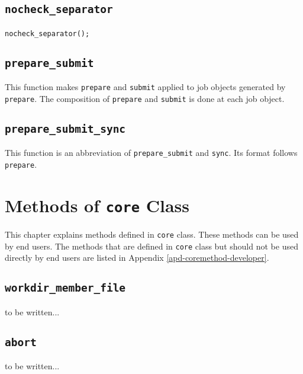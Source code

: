 \documentclass[a4paper,10pt]{report}
\begin{document}
\section{\texttt{nocheck\_separator}}

\subsubsection{\format}

\begin{boxnote}
\begin{alltt}
nocheck_separator();
\end{alltt}
\end{boxnote}
\vspace{\baselineskip}

\section{\texttt{prepare\_submit}}

This function makes \texttt{prepare} and \texttt{submit} applied to
job objects generated by \texttt{prepare}.  The composition of
\texttt{prepare} and \texttt{submit} is done at each job object.

\section{\texttt{prepare\_submit\_sync}}

This function is an abbreviation of \texttt{prepare\_submit} and
\texttt{sync}.  Its format follows \texttt{prepare}.

\chapter{Methods of \texttt{core} Class}\label{chap-coremethod-enduser}
This chapter explains methods defined in \texttt{core} class.
These methods can be used by end users.
The methods that are defined in \texttt{core} class but
should not be used directly by end users are listed in
Appendix \ref{apd-coremethod-developer}.

\section{\texttt{workdir\_member\_file}}
to be written...
\section{\texttt{abort}}
to be written...
\end{document}
